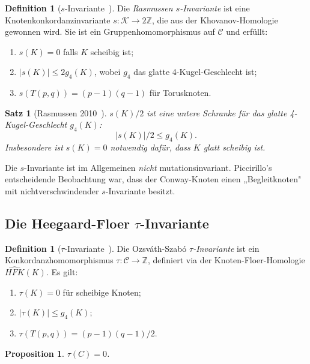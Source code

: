 \documentclass[12pt,a4paper]{amsart}
\newtheorem{proposition}[theorem]{Proposition}
\newtheorem{satz}[theorem]{Satz}
\theoremstyle{definition}
\newtheorem{definition_de}[theorem]{Definition}
\theoremstyle{remark}
\newcommand{\Z}{\mathbb{Z}}
\begin{document}
\begin{definition_de}[$s$-Invariante~\cite{Rasmussen2010}]
Die \emph{Rasmussen $s$-Invariante} ist eine Knotenkonkordanzinvariante
$s \colon \mathcal{K} \to 2\Z$, die aus der Khovanov-Homologie gewonnen wird.
Sie ist ein Gruppenhomomorphismus auf $\mathcal{C}$ und erfüllt:
\begin{enumerate}[label=\roman*)]
\item $s(K) = 0$ falls $K$ scheibig ist;
\item $|s(K)| \leq 2g_4(K)$, wobei $g_4$ das glatte 4-Kugel-Geschlecht ist;
\item $s(T(p,q)) = (p-1)(q-1)$ für Torusknoten.
\end{enumerate}
\end{definition_de}

\begin{satz}[Rasmussen 2010~\cite{Rasmussen2010}]
$s(K)/2$ ist eine untere Schranke für das glatte 4-Kugel-Geschlecht $g_4(K)$:
\[
    |s(K)|/2 \leq g_4(K).
\]
Insbesondere ist $s(K) = 0$ notwendig dafür, dass $K$ glatt scheibig ist.
\end{satz}

Die $s$-Invariante ist im Allgemeinen \emph{nicht} mutationsinvariant.
Piccirillo's entscheidende Beobachtung war, dass der Conway-Knoten einen
„Begleitknoten" mit nichtverschwindender $s$-Invariante besitzt.

\subsection{Die Heegaard-Floer $\tau$-Invariante}

\begin{definition_de}[$\tau$-Invariante~\cite{OzsvathSzabo2003}]
Die Ozsváth-Szabó \emph{$\tau$-Invariante} ist ein Konkordanzhomomorphismus
$\tau \colon \mathcal{C} \to \Z$, definiert via der Knoten-Floer-Homologie
$\widehat{HFK}(K)$. Es gilt:
\begin{enumerate}[label=\roman*)]
\item $\tau(K) = 0$ für scheibige Knoten;
\item $|\tau(K)| \leq g_4(K)$;
\item $\tau(T(p,q)) = (p-1)(q-1)/2$.
\end{enumerate}
\end{definition_de}

\begin{proposition}
$\tau(C) = 0$.
\end{proposition}
\end{document}

